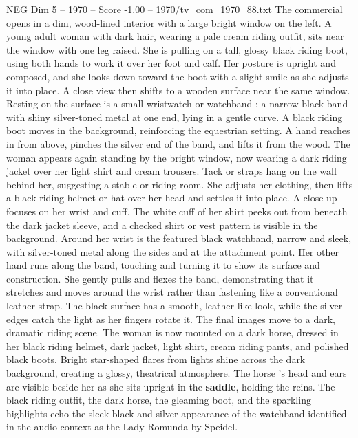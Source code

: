 \begin{textsample}{NEG Dim 5 – 1970 – Score -1.00 – 1970/tv\_com\_1970\_88.txt}  \label{ex:f5_neg_006}
The commercial opens in a dim, wood-lined interior with a large bright window on the left.
A young adult woman with dark hair, wearing a pale cream riding outfit, sits near the window with one leg raised.
She is pulling on a tall, glossy black riding boot, using both hands to work it over her foot and calf.
Her posture is upright and composed, and she looks down toward the boot with a slight smile as she adjusts it into place.
A close view then shifts to a wooden surface near the same window.
Resting on the surface is a small wristwatch or watchband : a narrow black band with shiny silver-toned metal at one end, lying in a gentle curve.
A black riding boot moves in the background, reinforcing the equestrian setting.
A hand reaches in from above, pinches the silver end of the band, and lifts it from the wood.
The woman appears again standing by the bright window, now wearing a dark riding jacket over her light shirt and cream trousers.
Tack or straps hang on the wall behind her, suggesting a stable or riding room.
She adjusts her clothing, then lifts a black riding helmet or hat over her head and settles it into place.
A close-up focuses on her wrist and cuff.
The white cuff of her shirt peeks out from beneath the dark jacket sleeve, and a checked shirt or vest pattern is visible in the background.
Around her wrist is the featured black watchband, narrow and sleek, with silver-toned metal along the sides and at the attachment point.
Her other hand runs along the band, touching and turning it to show its surface and construction.
She gently pulls and flexes the band, demonstrating that it stretches and moves around the wrist rather than fastening like a conventional leather strap.
The black surface has a smooth, leather-like look, while the silver edges catch the light as her fingers rotate it.
The final images move to a dark, dramatic riding scene.
The woman is now mounted on a dark horse, dressed in her black riding helmet, dark jacket, light shirt, cream riding pants, and polished black boots.
Bright star-shaped flares from lights shine across the dark background, creating a glossy, theatrical atmosphere.
The horse ’s head and ears are visible beside her as she sits upright in the \textbf{saddle}, holding the reins.
The black riding outfit, the dark horse, the gleaming boot, and the sparkling highlights echo the sleek black-and-silver appearance of the watchband identified in the audio context as the Lady Romunda by Speidel.

\end{textsample}
